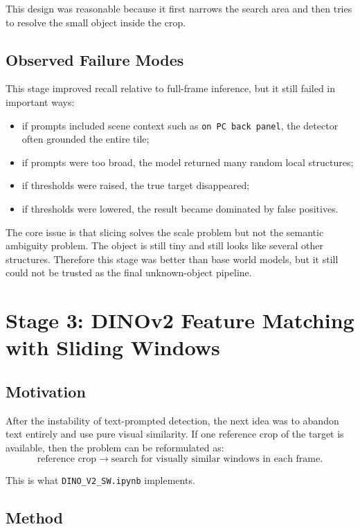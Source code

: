 \documentclass[11pt,a4paper]{article}
\begin{document}
This design was reasonable because it first narrows the search area and then tries to resolve the small object inside the crop.

\subsection{Observed Failure Modes}

This stage improved recall relative to full-frame inference, but it still failed in important ways:
\begin{itemize}[leftmargin=1.5em]
  \item if prompts included scene context such as \texttt{on PC back panel}, the detector often grounded the entire tile;
  \item if prompts were too broad, the model returned many random local structures;
  \item if thresholds were raised, the true target disappeared;
  \item if thresholds were lowered, the result became dominated by false positives.
\end{itemize}

The core issue is that slicing solves the scale problem but not the semantic ambiguity problem. The object is still tiny and still looks like several other structures. Therefore this stage was better than base world models, but it still could not be trusted as the final unknown-object pipeline.

\section{Stage 3: DINOv2 Feature Matching with Sliding Windows}

\subsection{Motivation}

After the instability of text-prompted detection, the next idea was to abandon text entirely and use pure visual similarity. If one reference crop of the target is available, then the problem can be reformulated as:
\[
\text{reference crop} \rightarrow \text{search for visually similar windows in each frame}.
\]

This is what \texttt{DINO\_V2\_SW.ipynb} implements.

\subsection{Method}
\end{document}
